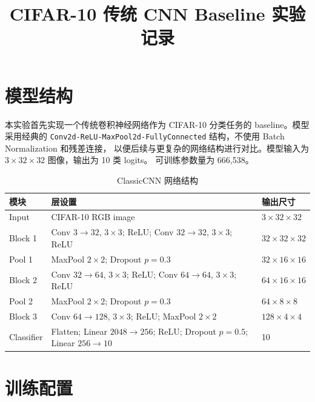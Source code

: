 \documentclass[UTF8]{ctexart}
\title{CIFAR-10 传统 CNN Baseline 实验记录}
\author{}
\date{}
\begin{document}
\maketitle

\section{模型结构}

本实验首先实现一个传统卷积神经网络作为 CIFAR-10 分类任务的 baseline。模型采用经典的
\texttt{Conv2d-ReLU-MaxPool2d-FullyConnected} 结构，不使用 Batch Normalization 和残差连接，
以便后续与更复杂的网络结构进行对比。模型输入为 $3\times32\times32$ 图像，输出为 10 类 logits。
可训练参数量为 666,538。

\begin{table}[H]
    \centering
    \caption{ClassicCNN 网络结构}
    \begin{tabularx}{\textwidth}{llY}
        \toprule
        模块 & 层设置 & 输出尺寸 \\
        \midrule
        Input & CIFAR-10 RGB image & $3\times32\times32$ \\
        Block 1 & Conv $3\rightarrow32$, $3\times3$; ReLU; Conv $32\rightarrow32$, $3\times3$; ReLU & $32\times32\times32$ \\
        Pool 1 & MaxPool $2\times2$; Dropout $p=0.3$ & $32\times16\times16$ \\
        Block 2 & Conv $32\rightarrow64$, $3\times3$; ReLU; Conv $64\rightarrow64$, $3\times3$; ReLU & $64\times16\times16$ \\
        Pool 2 & MaxPool $2\times2$; Dropout $p=0.3$ & $64\times8\times8$ \\
        Block 3 & Conv $64\rightarrow128$, $3\times3$; ReLU; MaxPool $2\times2$ & $128\times4\times4$ \\
        Classifier & Flatten; Linear $2048\rightarrow256$; ReLU; Dropout $p=0.5$; Linear $256\rightarrow10$ & 10 \\
        \bottomrule
    \end{tabularx}
\end{table}

\section{训练配置}
\end{document}
